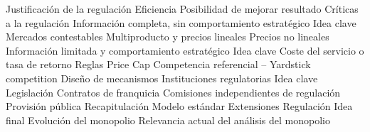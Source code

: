 \documentclass{nuevotema}
\begin{document}
\begin{esquema}[enumerate]
		\2 Justificación de la regulación
			\3 Eficiencia
			\3 Posibilidad de mejorar resultado
			\3 Críticas a la regulación
		\2 Información completa, sin comportamiento estratégico
			\3 Idea clave
			\3 Mercados contestables
			\3 Multiproducto y precios lineales
			\3 Precios no lineales
		\2 Información limitada y comportamiento estratégico
			\3 Idea clave
			\3 Coste del servicio o tasa de retorno
			\3 Reglas Price Cap
			\3 Competencia referencial -- Yardstick competition
			\3 Diseño de mecanismos
		\2 Instituciones regulatorias
			\3 Idea clave
			\3 Legislación
			\3 Contratos de franquicia
			\3 Comisiones independientes de regulación
			\3 Provisión pública
	\1[] 
		\2 Recapitulación
			\3 Modelo estándar
			\3 Extensiones
			\3 Regulación
		\2 Idea final
			\3 Evolución del monopolio
			\3 Relevancia actual del análisis del monopolio

\end{esquema}

\esquemalargo
\end{document}
